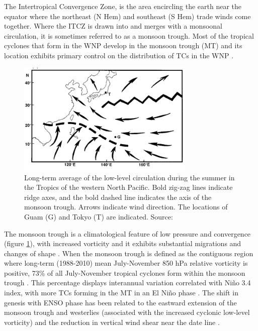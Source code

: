 The Intertropical Convergence Zone, is the area encircling the earth near the equator where the northeast (N Hem) and southeast (S Hem) trade winds come together. Where the ITCZ is drawn into and merges with a monsoonal circulation, it is sometimes referred to as a monsoon trough. Most of the tropical cyclones that form in the WNP develop in the monsoon trough (MT) \citep{lander1994exploratory} and its location exhibits primary control on the distribution of TCs in the WNP \citep{wuinfluence}. 

\begin{figure}[h]
	\centering
	\noindent\includegraphics[width=20pc,angle=0]{MT_Lander.png}
	\caption{Long-term average of the low-level circulation during the summer in the Tropics of the western North Pacific. Bold zig-zag lines indicate ridge axes, and the bold dashed line indicates the axis of the monsoon trough. Arrows indicate wind direction. The locations of Guam (G) and Tokyo (T) are indicated. Source: \cite{lander1996specific}}\label{fig:MT}
\end{figure}

The monsoon trough is a climatological feature of low pressure and convergence (figure \ref{fig:MT}), with increased vorticity and it exhibits substantial migrations and changes of shape \citep{lander1996specific}. When the monsoon trough is defined as the contiguous region where long-term (1988-2010) mean July-November 850 hPa relative vorticity is positive, 73\% of all July-November tropical cyclones form within the monsoon trough \citep{molinari2013percentage}. This percentage displays interannual variation correlated with Ni\~{n}o 3.4 index, with more TCs forming in the MT in an El Ni\~{n}o phase \citep{molinari2013percentage}. The shift in genesis with ENSO phase has been related to the eastward extension of the monsoon trough and westerlies (associated with the increased cyclonic low-level vorticity) and the reduction in vertical wind shear near the date line \citep{lander1994exploratory, lander1996specific, wang2002strong}.

